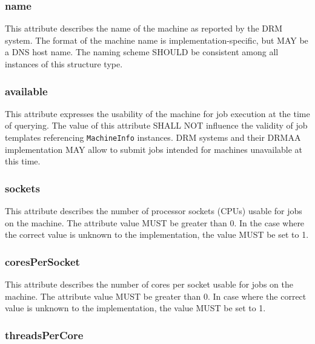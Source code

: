 \documentclass{article}
\newcommand{\h}[1]{\lstinline|#1|}
\newcommand{\rat}[1]{}
\begin{document}


\subsubsection{name}

This attribute describes the name of the machine as reported by the DRM system. The format of the machine name is implementation-specific, but MAY be a DNS host name. The naming scheme SHOULD be consistent among all instances of this structure type.

\subsubsection{available}

This attribute expresses the usability of the machine for job execution at the time of querying. The value of this attribute SHALL NOT influence the validity of job templates referencing \h{MachineInfo} instances. DRM systems and their DRMAA implementation MAY allow to submit jobs intended for machines unavailable at this time.

\rat{These jobs are expected to be queued until the machine becomes available again.}

\subsubsection{sockets}
\label{sec:sockets}

This attribute describes the number of processor sockets (CPUs) usable for jobs on the machine. The attribute value MUST be greater than 0. In the case where the correct value is unknown to the implementation, the value MUST be set to 1.

\subsubsection{coresPerSocket}
\label{sec:cores}

This attribute describes the number of cores per socket usable for jobs on the machine. The attribute value MUST be greater than 0. In case where the correct value is unknown to the implementation, the value MUST be set to 1.

\subsubsection{threadsPerCore}
\end{document}
